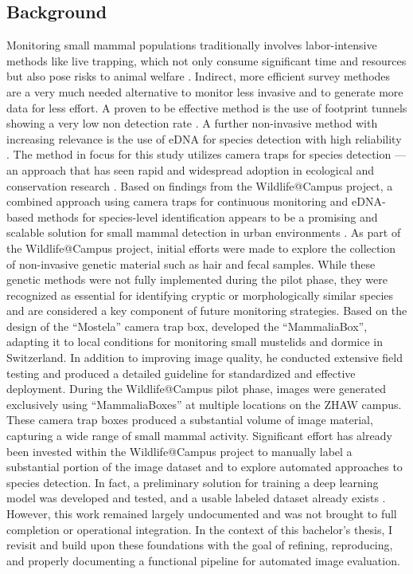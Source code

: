 \subsection{Background}
Monitoring small mammal populations traditionally involves labor-intensive methods like live trapping, which not only consume significant time and resources but also pose risks to animal welfare \autocite{grafWildlifeCampusKleineSaeugetiere2022}.
Indirect, more efficient survey methodes are a very much needed alternative to monitor less invasive and to generate more data for less effort.
A proven to be effective method is the use of footprint tunnels showing a very low non detection rate \autocite{yarnellUsingOccupancyAnalysis2014}.
A further non-invasive method with increasing relevance is the use of \ac{eDNA} for species detection with high reliability \autocite{thomsenEnvironmentalDNAEmerging2015}.
The method in focus for this study utilizes camera traps for species detection --- an approach that has seen rapid and widespread adoption in ecological and conservation research \autocite{delisleNextGenerationCameraTrapping2021}.
Based on findings from the Wildlife@Campus project, a combined approach using camera traps for continuous monitoring and \acs{eDNA}-based methods for species-level identification appears to be a promising and scalable solution for small mammal detection in urban environments \autocite{grafWildlifeCampusKleineSaeugetiere2022}.
As part of the Wildlife@Campus project, initial efforts were made to explore the collection of non-invasive genetic material such as hair and fecal samples.
While these genetic methods were not fully implemented during the pilot phase, they were recognized as essential for identifying cryptic or morphologically similar species and are considered a key component of future monitoring strategies.
Based on the design of the \enquote{Mostela} camera trap box, \textcite{aegerterMonitoringKleinmustelidenSchlaefern2019} developed the \enquote{MammaliaBox}, adapting it to local conditions for monitoring small mustelids and dormice in Switzerland.
In addition to improving image quality, he conducted extensive field testing and produced a detailed guideline for standardized and effective deployment.
During the Wildlife@Campus pilot phase, images were generated exclusively using \enquote{MammaliaBoxes} at multiple locations on the ZHAW campus. 
These camera trap boxes produced a substantial volume of image material, capturing a wide range of small mammal activity.
Significant effort has already been invested within the Wildlife@Campus project to manually label a substantial portion of the image dataset and to explore automated approaches to species detection.
In fact, a preliminary solution for training a deep learning model was developed and tested, and a usable labeled dataset already exists \autocite{ratnaweeraWildlifeCampusProgressReports2021}.
However, this work remained largely undocumented and was not brought to full completion or operational integration. 
In the context of this bachelor's thesis, I revisit and build upon these foundations with the goal of refining, reproducing, and properly documenting a functional pipeline for automated image evaluation.

